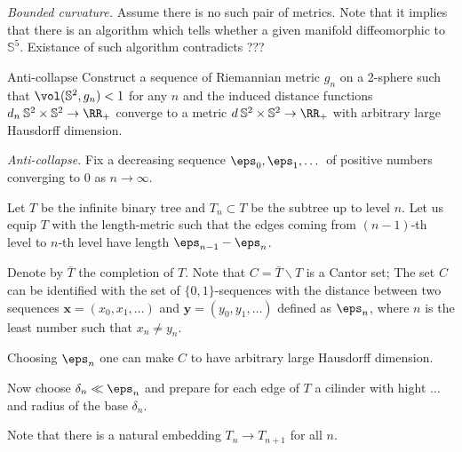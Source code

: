 \textit{Bounded curvature.}
Assume there is no such pair of metrics.
Note that it implies that there is an algorithm which 
tells whether a given manifold diffeomorphic to $\mathbb{S}^5$.
Existance of such algorithm contradicts ???



























\begin{pr}{}{Anti-collapse}\label{anti-collaps} Construct
a sequence of Riemannian metric $g_n$ on a 2-sphere such that 
$\vol (\mathbb S^2,g_n)<1$ for any $n$ 
and the induced distance functions $d_n\:\mathbb{S}^2\times \mathbb{S}^2\to \RR_+$
converge to a metric $d\:\mathbb{S}^2\times \mathbb{S}^2\to \RR_+$ 
with arbitrary large Hausdorff dimension.
\end{pr}

\textit{Anti-collapse.}
Fix a decreasing sequence $\eps_0,\eps_1,\dots$ of positive numbers converging to $0$ as $n\to \infty$.

Let $T$ be the infinite binary tree
and $T_n\subset T$ be the subtree up to level $n$.
Let us equip $T$ with the length-metric such that the edges coming from $(n-1)$-th level to $n$-th level have length $\eps_{n-1}-\eps_n$.

Denote by $\bar T$ the completion of $T$.
Note that $C=\bar T\backslash T$ is a Cantor set;
The set $C$ can be identified with the set of $\{0,1\}$-sequences 
with the distance between two sequences $\bm{x}=(x_0,x_1,\dots)$ and $\bm{y}=(y_0,y_1,\dots)$ defined as $\eps_n$, where $n$ is the least number such that $x_n\ne y_n$.

Choosing $\eps_n$ one can make $C$ to have arbitrary large Hausdorff dimension.

Now choose $\delta_n\ll\eps_n$ and prepare for each edge of $T$ a cilinder with hight ... and radius of the base $\delta_n$.
 

Note that there is a natural embedding $T_{n}\to T_{n+1}$ for all $n$.


